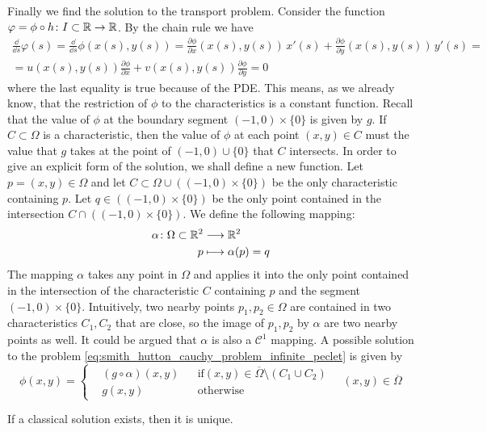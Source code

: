 Finally we find the solution to the transport problem. Consider the function
$\varphi = \phi \circ h \colon I \subset \mathbb{R} \to \mathbb{R}$. By the chain rule we
have
\begin{multline*}
	\frac{\dd}{\dd{s}} \varphi(s) = 
	\frac{\dd}{\dd{s}} \phi(x(s), y(s)) = 
	\frac{\partial \phi}{\partial x} (x(s), y(s)) \, x'(s) + 
	\frac{\partial \phi}{\partial y} (x(s), y(s)) \, y'(s) = \\ =
	u(x(s),y(s)) \frac{\partial \phi}{\partial x} + 
	v(x(s),y(s)) \frac{\partial \phi}{\partial y} = 0
\end{multline*}
where the last equality is true because of the PDE. This means, as we already
know, that the restriction of $\phi$ to the characteristics is a constant
function. Recall that the value of $\phi$ at the boundary segment $(-1,0) \times
\{ 0 \}$ is given by $g$. If $C \subset \Omega$ is a characteristic, then the
value of $\phi$ at each point $(x,y) \in C$ must the value that $g$ takes at the
point of $(-1,0) \cup \{ 0 \}$ that $C$ intersects. In order to give an explicit
form of the solution, we shall define a new function. Let $p = (x,y) \in \Omega$
and let $C \subset \Omega \cup ((-1,0) \times \{ 0 \})$ be the only
characteristic containing $p$. Let $q \in ((-1,0) \times \{ 0 \})$ be the only
point contained in the intersection $C \cap ((-1,0) \times \{ 0 \})$. We define
the following mapping:
\begin{equation*}
	\begin{aligned}
		\alpha \colon \Omega \subset \mathbb{R}^2 &\longrightarrow \mathbb{R}^2 \\
		p &\longmapsto \alpha(p) = q
	\end{aligned}
\end{equation*}
The mapping $\alpha$ takes any point in $\Omega$ and applies it into the only
point contained in the intersection of the characteristic $C$ containing $p$ and
the segment $(-1,0) \times \{ 0 \}$. Intuitively, two nearby points $p_1, p_2
\in \Omega$ are contained in two characteristics $C_1, C_2$ that are close, so
the image of $p_1, p_2$ by $\alpha$ are two nearby points as well. It could be
argued that $\alpha$ is also a $\mathcal{C}^1$ mapping. A possible solution to
the problem \eqref{eq:smith_hutton_cauchy_problem_infinite_peclet} is given by
\begin{equation*}
	\phi(x,y) = 
	\left\{
	\begin{aligned}
		&(g \circ \alpha)(x,y) & &\text{if} (x,y) \in \overline{\Omega} \setminus (C_1 \cup C_2) \\
		&g(x,y) & &\text{otherwise}
	\end{aligned}
	\right.
	\quad (x,y) \in \overline{\Omega}
\end{equation*}

\begin{theorem}
	If a classical solution exists, then it is unique.
\end{theorem}
